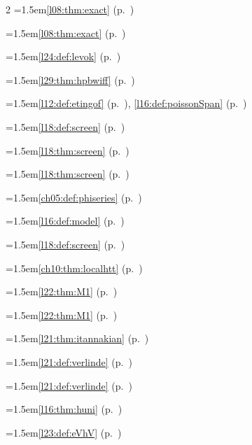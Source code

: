 \begin{multicols}{2}
\hangindent=1.5em\quad \ref{l08:thm:exact} (p.~\pageref{l08:thm:exact})\par
\hangindent=1.5em\quad \ref{l08:thm:exact} (p.~\pageref{l08:thm:exact})\par
\hangindent=1.5em\quad \ref{l24:def:levok} (p.~\pageref{l24:def:levok})\par
\hangindent=1.5em\quad \ref{l29:thm:hpbwiff} (p.~\pageref{l29:thm:hpbwiff})\par
\hangindent=1.5em\quad \ref{l12:def:etingof} (p.~\pageref{l12:def:etingof}), \ref{l16:def:poissonSpan} (p.~\pageref{l16:def:poissonSpan})\par
\hangindent=1.5em\quad \ref{l18:def:screen} (p.~\pageref{l18:def:screen})\par
\hangindent=1.5em\quad \ref{l18:thm:screen} (p.~\pageref{l18:thm:screen})\par
\hangindent=1.5em\quad \ref{l18:thm:screen} (p.~\pageref{l18:thm:screen})\par
\hangindent=1.5em\quad \ref{ch05:def:phiseries} (p.~\pageref{ch05:def:phiseries})\par
\hangindent=1.5em\quad \ref{l16:def:model} (p.~\pageref{l16:def:model})\par
\hangindent=1.5em\quad \ref{l18:def:screen} (p.~\pageref{l18:def:screen})\par
\hangindent=1.5em\quad \ref{ch10:thm:localhtt} (p.~\pageref{ch10:thm:localhtt})\par
\hangindent=1.5em\quad \ref{l22:thm:M1} (p.~\pageref{l22:thm:M1})\par
\hangindent=1.5em\quad \ref{l22:thm:M1} (p.~\pageref{l22:thm:M1})\par
\hangindent=1.5em\quad \ref{l21:thm:itannakian} (p.~\pageref{l21:thm:itannakian})\par
\hangindent=1.5em\quad \ref{l21:def:verlinde} (p.~\pageref{l21:def:verlinde})\par
\hangindent=1.5em\quad \ref{l21:def:verlinde} (p.~\pageref{l21:def:verlinde})\par
\hangindent=1.5em\quad \ref{l16:thm:huni} (p.~\pageref{l16:thm:huni})\par
\hangindent=1.5em\quad \ref{l23:def:eVhV} (p.~\pageref{l23:def:eVhV})\par

\end{multicols}
